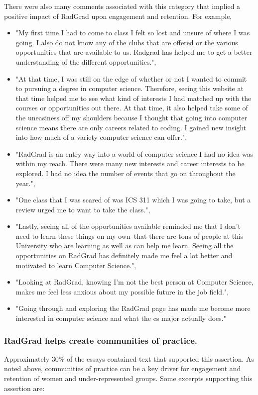 \documentclass[acmsmall]{acmart}
\begin{document}
There were also many comments associated with this category that implied a positive impact of RadGrad upon engagement and retention. For example,
\begin{itemize}[leftmargin=*]
\item "My first time I had to come to class I felt so lost and unsure of where I was going. I also do not know any of the clubs that are offered or the various opportunities that are available to us. Radgrad has helped me to get a better understanding of the different opportunities.",
\item "At that time, I was still on the edge of whether or not I wanted to commit to pursuing a degree in computer science. Therefore, seeing this website at that time helped me to see what kind of interests I had matched up with the courses or opportunities out there. At that time, it also helped take some of the uneasiness off my shoulders because I thought that going into computer science means there are only careers related to coding. I gained new insight into how much of a variety computer science can offer.",
\item "RadGrad is an entry way into a world of computer science I had no idea was within my reach. There were many new interests and career interests to be explored. I had no idea the number of events that go on throughout the year.",
\item "One class that I was scared of was ICS 311 which I was going to take, but a review urged me to want to take the class.",
\item "Lastly, seeing all of the opportunities available reminded me that I don't need to learn these things on my own--that there are tons of people at this University who are learning as well as can help me learn. Seeing all the opportunities on RadGrad has definitely made me feel a lot better and motivated to learn Computer Science.",
\item "Looking at RadGrad, knowing I'm not the best person at Computer Science, makes me feel less anxious about my possible future in the job field.",
\item "Going through and exploring the RadGrad page has made me become more interested in computer science and what the cs major actually does."
\end{itemize}

\subsubsection{RadGrad helps create communities of practice.} Approximately 30\% of the essays contained text that supported this assertion. As noted above, communities of practice can be a key driver for engagement and retention of women and under-represented groups. Some excerpts supporting this assertion are:
\end{document}
